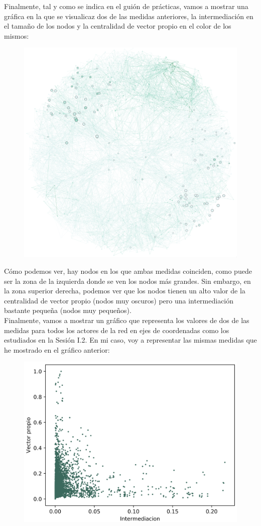 \documentclass[11pt]{article}
\begin{document}
Finalmente, tal y como se indica en el guión de prácticas, vamos a mostrar una gráfica en la que se visualicaz dos de las medidas anteriores, la intermediación en el tamaño de los nodos y la centralidad de vector propio en el color de los mismos:

\begin{figure}[H]
	\centering
	\includegraphics[width=0.6\linewidth]{images/2_2_betweenness_eigenvector.png}
\end{figure}

Cómo podemos ver, hay nodos en los que ambas medidas coinciden, como puede ser la zona de la izquierda donde se ven los nodos más grandes. Sin embargo, en la zona superior derecha, podemos ver que los nodos tienen un alto valor de la centralidad de vector propio (nodos muy oscuros) pero una intermediación bastante pequeña (nodos muy pequeños). \\

Finalmente, vamos a mostrar un gráfico que representa los valores de dos de las medidas para todos los actores de la red en ejes de coordenadas como los estudiados en la Sesión I.2. En mi caso, voy a representar las mismas medidas que he mostrado en el gráfico anterior:

\begin{figure}[H]
	\centering
	\includegraphics[width=0.6\linewidth]{images/2_2_betweenness_eigenvector_axis.png}
\end{figure}
\end{document}
